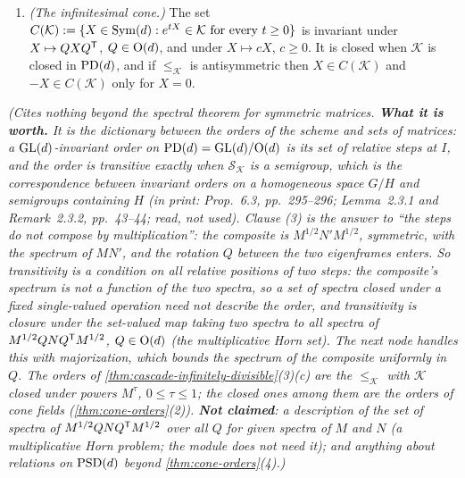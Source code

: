 \begin{proposition}
\begin{enumerate}
eigenvalues are those of $MN'$. Conversely, for $M, N \in \mathcal K$ the triple $I$, $M$,
$M^{1/2}NM^{1/2}$ is such a chain. So $\le_{\mathcal K}$ is transitive if and only if
$M^{1/2}NM^{1/2} \in \mathcal K$ for all $M, N \in \mathcal K$, if and only if $\mathcal S_{\mathcal K}$
is closed under products. The spectrum of the composite is not determined by the spectra of the two
steps: for $d = 2$ the step $\diag(4,1)$ followed by $\diag(4,1)$ gives $\diag(16,1)$, and followed by
$\diag(1,4)$ gives $4I$.
\item \emph{(The infinitesimal cone.)} The set
$C(\mathcal K) := \{X \in \mathrm{Sym}(d) : e^{tX} \in \mathcal K \text{ for every } t \ge 0\}$ is invariant
under $X \mapsto QXQ^{\mathsf{T}}$, $Q \in \mathrm{O}(d)$, and under $X \mapsto cX$, $c \ge 0$. It is closed when
$\mathcal K$ is closed in $\mathrm{PD}(d)$, and if $\le_{\mathcal K}$ is antisymmetric then
$X \in C(\mathcal K)$ and $-X \in C(\mathcal K)$ only for $X = 0$.
\end{enumerate}
\statusT\quad\emph{(Cites nothing beyond the spectral theorem for symmetric matrices. \textbf{What it is
worth.} It is the dictionary between the orders of the scheme and sets of matrices: a
$\mathrm{GL}(d)$-invariant order on $\mathrm{PD}(d) = \mathrm{GL}(d)/\mathrm{O}(d)$ is its set of relative steps at $I$, and the
order is transitive exactly when $\mathcal S_{\mathcal K}$ is a semigroup, which is the correspondence
between invariant orders on a homogeneous space $G/H$ and semigroups containing $H$ (in print:
 Prop.~6.3, pp.~295--296;  Lemma~2.3.1 and
Remark~2.3.2, pp.~43--44; read, not used). Clause (3) is the answer to ``the steps do not compose by
multiplication'': the composite is $M^{1/2}N'M^{1/2}$, symmetric, with the spectrum of $MN'$, and the
rotation $Q$ between the two eigenframes enters. So transitivity is a condition on all relative
positions of two steps: the composite's spectrum is not a function of the two spectra, so a set of
spectra closed under a fixed single-valued operation need not describe the order, and transitivity is
closure under the set-valued map taking two spectra to all spectra of $M^{1/2}QNQ^{\mathsf{T}}M^{1/2}$,
$Q \in \mathrm{O}(d)$ (the multiplicative Horn set).
The next node handles this with majorization, which bounds the spectrum of the composite uniformly in
$Q$. The orders of \ref{thm:cascade-infinitely-divisible}(3)(c) are the $\le_{\mathcal K}$ with
$\mathcal K$ closed under powers $M^\tau$, $0 \le \tau \le 1$; the closed ones among them are the
orders of cone fields (\ref{thm:cone-orders}(2)). \textbf{Not claimed}: a description of the set of
spectra of $M^{1/2}QNQ^{\mathsf{T}}M^{1/2}$ over all $Q$ for given spectra of $M$ and $N$ (a multiplicative
Horn problem; the module does not need it); and anything about relations on $\mathrm{PSD}(d)$ beyond
\ref{thm:cone-orders}(4).)}
\end{proposition}

